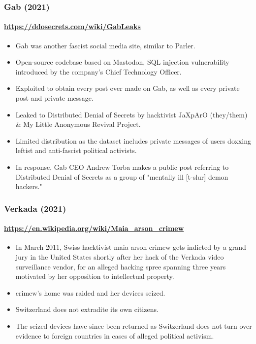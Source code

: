 \documentclass[aspectratio=169,usenames,dvipsnames]{beamer}
\begin{document}
\begin{frame}
  \frametitle{Gab (2021)}
  \framesubtitle{\url{https://ddosecrets.com/wiki/GabLeaks}}

  \begin{itemize}[<+->]
    \item Gab was another fascist social media site, similar to Parler.
    \item Open-source codebase based on Mastodon, SQL injection vulnerability
      introduced by the company's Chief Technology Officer.
    \item Exploited to obtain every post ever made on Gab, as well as every
      private post and private message.
    \item Leaked to Distributed Denial of Secrets by hacktivist JaXpArO
      (they/them) \& My Little Anonymous Revival Project.
    \item Limited distribution as the dataset includes private messages of
      users doxxing leftist and anti-fascist political activists.
    \item In response, Gab CEO Andrew Torba makes a public post referring to
      Distributed Denial of Secrets as a group of "mentally ill [t-slur] demon
      hackers."
  \end{itemize}
\end{frame}


\begin{frame}
  \frametitle{Verkada (2021)}
  \framesubtitle{\url{https://en.wikipedia.org/wiki/Maia_arson_crimew}}

  \begin{itemize}[<+->]
    \item In March 2011, Swiss hacktivist maia arson crimew gets indicted by a grand
      jury in the United States shortly after her hack of the Verkada video
      surveillance vendor, for an alleged hacking spree spanning three years
      motivated by her opposition to intellectual property.
    \item crimew's home was raided and her devices seized.
    \item Switzerland does not extradite its own citizens.
    \item The seized devices have since been returned as Switzerland does not
      turn over evidence to foreign countries in cases of alleged political
      activism.
  \end{itemize}

\end{frame}
\end{document}
